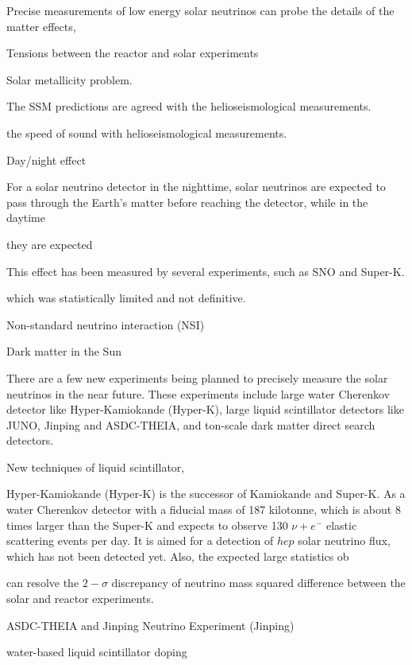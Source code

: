 Precise measurements of low energy solar neutrinos can probe the details of the matter effects, 

Tensions between the reactor and solar experiments
	
Solar metallicity problem.
	
	The SSM predictions are agreed with the helioseismological measurements\cite{gann2015everything,oberauer2020solar}. 
	
	the speed of sound with helioseismological measurements. 
	
Day/night effect
	
	For a solar neutrino detector in the nighttime, solar neutrinos are expected to pass through the Earth's matter before reaching the detector, while in the daytime 
	
	
	
	   
	 they are expected 
	
	 
	
	This effect has been measured by several experiments, such as SNO\cite{aharmim2013combined} and Super-K\cite{abe2016solar}.
	
	which was
statistically limited and not definitive\cite{abe2016solar,suzuki2020sun}.
	
Non-standard neutrino interaction (NSI)   
	
Dark matter in the Sun


There are a few new experiments being planned to precisely measure the solar neutrinos in the near future. These experiments include large water Cherenkov detector like Hyper-Kamiokande (Hyper-K), large liquid scintillator detectors like JUNO, Jinping and ASDC-THEIA, and ton-scale dark matter direct search detectors. 

New techniques of liquid scintillator, 

Hyper-Kamiokande (Hyper-K) is the successor of Kamiokande and Super-K. As a water Cherenkov detector with a fiducial mass of 187 kilotonne, which is about 8 times larger than the Super-K and expects to observe 130 $\nu+e^-$ elastic scattering events per day. It is aimed for a detection of $hep$ solar neutrino flux, which has not been detected yet. Also, the expected large statistics ob

 can resolve the $2-\sigma$ discrepancy of neutrino mass squared difference between the solar and reactor experiments. 

ASDC-THEIA and Jinping Neutrino Experiment (Jinping)\cite{beacom2017physics}

water-based liquid scintillator 
doping


